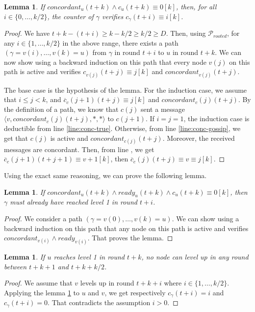 \documentclass[11pt,letterpaper]{article}
\renewcommand{\leq}{\leqslant}
\renewcommand{\geq}{\geqslant}
\newtheorem{lem}[thm]{Lemma}
\newcommand{\cent}{\gamma}
\begin{document}
\begin{lem} \label{lem:conc-safety}
	If $concordant_u(t+k) \wedge c_u(t+k) \equiv 0 [k]$, then, for all $i \in \{0, \dots, k/2\}$, the counter of $\cent$ verifies $c_\cent(t+i) \equiv i [k]$.
\end{lem}
\begin{proof}
	We have $t+k - (t+i) \geq k - k/2 \geq k/2 \geq D$.
	Then, using $\mathcal{P}_{rooted}$, for any $i \in \{1, \dots, k/2\}$ in the above range, there exists a path $(\cent = v(i), \dots, v(k) = u)$ from $\cent$ in round $t+i$ to $u$ in round $t+k$. 
	We can now show using a backward induction on this path that every node $v(j)$ on this path is active and verifies $c_{v(j)}(t+j) \equiv j [k]$ and $concordant_{v(j)}(t+j)$.

	The base case is the hypothesis of the lemma.
	For the induction case, we assume that $i \leq j < k$, and $\overline{c}_c(j+1)(t+j) \equiv j [k]$ and $concordant_c(j)(t+j)$.
	By the definition of a path, we know that $c(j)$ sent a message $\langle v, concordant_c(j)(t+j), *, * \rangle$ to $c(j+1)$.
	If $i = j = 1$, the induction case is deductible from line \ref{line:conc-true}.
	Otherwise, from line \ref{line:conc-gossip}, we get that $c(j)$ is active and $concordant_{c(j)}(t+j)$. Moreover, the received messages are concordant.
	Then, from line \label{line:min-z-end}, we get $\overline{c}_c(j+1)(t+j+1) \equiv v+1 [k]$, then $\overline{c}_c(j)(t+j) \equiv v \equiv j [k]$.
\end{proof}

Using the exact same reasoning, we can prove the following lemma.
\begin{lem} \label{lem:conc-safety-bis}
	If $concordant_u(t+k) \wedge ready_u(t+k) \wedge c_u(t+k) \equiv 0 [k]$, then $\cent$ must already have reached level 1 in round $t+i$.
\end{lem}
\begin{proof}
	We consider a path $(\cent = v(0), \dots, v(k) = u)$.
	We can show using a backward induction on this path that any node on this path is active and verifies $concordant_{v(i)} \wedge ready_{v(i)}$.
	That proves the lemma.
\end{proof}

\begin{lem} \label{lem:no-close-level2}
	If $u$ reaches level 1 in round $t+k$, no node can level up in any round between $t+k+1$ and $t+k+k/2$.
\end{lem}
\begin{proof}
	We assume that $v$ levels up in round $t+k+i$ where $i \in \{1, \dots, k/2\}$.
	Applying the lemma \ref{lem:conc-safety} to $u$ and $v$, we get respectively $c_\cent(t+i) = i$ and $c_\cent(t+i) = 0$.
	That contradicts the assumption $i > 0$.
\end{proof}
\end{document}
